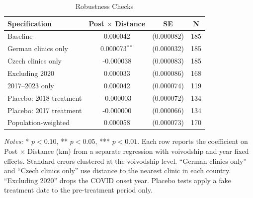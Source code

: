 \begin{table}[H]
\centering
\caption{Robustness Checks}
\begin{threeparttable}
\begin{tabular}{lccc}
\toprule
Specification & Post $\times$ Distance & SE & N \\
\midrule
Baseline & 0.000042 & (0.000082) & 185 \\
German clinics only & 0.000073$^{**}$ & (0.000032) & 185 \\
Czech clinics only & -0.000038 & (0.000083) & 185 \\
Excluding 2020 & 0.000033 & (0.000086) & 168 \\
2017--2023 only & 0.000042 & (0.000074) & 119 \\
Placebo: 2018 treatment & -0.000003 & (0.000072) & 134 \\
Placebo: 2017 treatment & -0.000000 & (0.000066) & 134 \\
Population-weighted & 0.000058 & (0.000073) & 170 \\
\bottomrule
\end{tabular}
\begin{tablenotes}[flushleft]
\small
\item \textit{Notes:} * $p<0.10$, ** $p<0.05$, *** $p<0.01$. Each row reports the coefficient on Post $\times$ Distance (km) from a separate regression with voivodship and year fixed effects. Standard errors clustered at the voivodship level. ``German clinics only'' and ``Czech clinics only'' use distance to the nearest clinic in each country. ``Excluding 2020'' drops the COVID onset year. Placebo tests apply a fake treatment date to the pre-treatment period only.
\end{tablenotes}
\end{threeparttable}
\label{tab:robustness}
\end{table}

